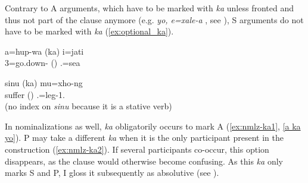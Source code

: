 %
%

%
%


Contrary to A arguments, which have to be marked with \textit{ka} unless fronted and thus not part of the clause anymore (e.g. \textit{yo, e=xale-a} , see ), S arguments do not have to be marked with \textit{ka} (\ref{ex:optional_ka}).

\ea \label{ex:optional_ka}
\gll a=hup-wa (ka) i=jati\\
 3=go.down- () .=sea\\
\glt {}
\z

\ea
\gll sinu (ka) mu=xho-ng\\
 suffer () .=leg-1.\\
\glt {} (no index on \textit{sinu} because it is a stative verb)
\z


%
%
%


In nominalizations as well, \textit{ka}  obligatorily occurs to mark A (\ref{ex:nmlz-ka1}, \ref{a ka yo}). P may take a different \textit{ka}  when it is the only participant present in the construction (\ref{ex:nmlz-ka2}). If several participants co-occur, this option disappears, as the clause would otherwise become confusing. As this \textit{ka} only marks S and P, I gloss it subsequently as absolutive (see ).


